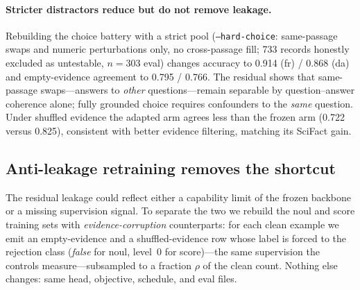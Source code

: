 \documentclass[11pt]{article}
\begin{document}
\paragraph{Stricter distractors reduce but do not remove leakage.}
Rebuilding the choice battery with a strict pool (\texttt{--hard-choice}:
same-passage swaps and numeric perturbations only, no cross-passage
fill; 733 records honestly excluded as untestable, $n=303$ eval)
changes accuracy to 0.914 (fr) / 0.868 (da) and empty-evidence
agreement to 0.795 / 0.766. The residual shows that same-passage
swaps---answers to \emph{other} questions---remain separable by
question--answer coherence alone; fully grounded choice requires
confounders to the \emph{same} question. Under shuffled evidence the
adapted arm agrees less than the frozen arm (0.722 versus 0.825),
consistent with better evidence filtering, matching its SciFact gain.

\subsection{Anti-leakage retraining removes the shortcut}
\label{sec:antileak}

The residual leakage could reflect either a capability limit of the
frozen backbone or a missing supervision signal. To separate the two we
rebuild the noul and score training sets with
\emph{evidence-corruption} counterparts: for each clean example we emit
an empty-evidence and a shuffled-evidence row whose label is forced to
the rejection class (\emph{false} for noul, level~0 for score)---the
same supervision the controls measure---subsampled to a fraction
$\rho$ of the clean count. Nothing else changes: same head, objective,
schedule, and eval files.
\end{document}
